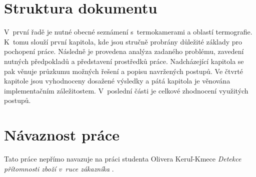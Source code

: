\begin{introduction}
	\section{Struktura dokumentu}
    V~první řadě je nutné obecné seznámení s~termokamerami a oblastí termografie. K~tomu slouží první kapitola, kde jsou stručně probrány důležité základy pro pochopení práce. Následně je provedena analýza zadaného problému, zavedení nutných předpokladů a představení prostředků práce. Nadcházející kapitola se pak věnuje průzkumu možných řešení a popisu navržených postupů. Ve čtvrté kapitole jsou  vyhodnoceny dosažené výsledky a pátá kapitola  je věnována  implementačním záležitostem. V~poslední části je celkové zhodnocení využitých postupů. 
    
	\section{Návaznost práce}
	Tato práce nepřímo navazuje na práci studenta Olivera Keruľ-Kmece \textit{Detekce přítomnosti zboží v~ruce zákazníka} \cite{kerul2016detekce}. 

\end{introduction}